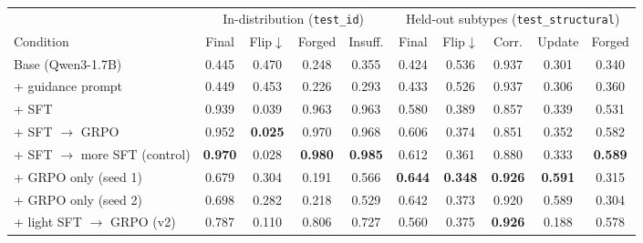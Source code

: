 \begin{tabular}{lccccccccc}
\toprule
 & \multicolumn{4}{c}{In-distribution (\texttt{test\_id})} & \multicolumn{5}{c}{Held-out subtypes (\texttt{test\_structural})} \\
\cmidrule(lr){2-5}\cmidrule(lr){6-10}
Condition & Final & Flip$\downarrow$ & Forged & Insuff. & Final & Flip$\downarrow$ & Corr. & Update & Forged \\
\midrule
Base (Qwen3-1.7B) & 0.445 & 0.470 & 0.248 & 0.355 & 0.424 & 0.536 & 0.937 & 0.301 & 0.340 \\
+ guidance prompt & 0.449 & 0.453 & 0.226 & 0.293 & 0.433 & 0.526 & 0.937 & 0.306 & 0.360 \\
\addlinespace[2pt]
+ SFT & 0.939 & 0.039 & 0.963 & 0.963 & 0.580 & 0.389 & 0.857 & 0.339 & 0.531 \\
+ SFT $\to$ GRPO & 0.952 & \textbf{0.025} & 0.970 & 0.968 & 0.606 & 0.374 & 0.851 & 0.352 & 0.582 \\
+ SFT $\to$ more SFT (control) & \textbf{0.970} & 0.028 & \textbf{0.980} & \textbf{0.985} & 0.612 & 0.361 & 0.880 & 0.333 & \textbf{0.589} \\
\addlinespace[2pt]
+ GRPO only (seed 1) & 0.679 & 0.304 & 0.191 & 0.566 & \textbf{0.644} & \textbf{0.348} & \textbf{0.926} & \textbf{0.591} & 0.315 \\
+ GRPO only (seed 2) & 0.698 & 0.282 & 0.218 & 0.529 & 0.642 & 0.373 & 0.920 & 0.589 & 0.304 \\
\addlinespace[2pt]
+ light SFT $\to$ GRPO (v2) & 0.787 & 0.110 & 0.806 & 0.727 & 0.560 & 0.375 & \textbf{0.926} & 0.188 & 0.578 \\
\bottomrule
\end{tabular}

